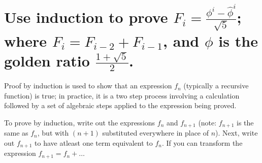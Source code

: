 \section[Problem 2]{Use induction to prove $F_i = \frac{\phi^i - \hat{\phi}^i}{\sqrt{5}}$; where $F_i = F_{i-2} + F_{i-1}$, and $\phi$ is the golden ratio $\frac{1 + \sqrt{5}}{2}$.}

Proof by induction is used to show that an expression $f_n$ (typically a recursive function) is true; in practice, it is a two step process involving a calculation followed by a set of algebraic steps applied to the expression being proved. 

To prove by induction, write out the expressions $f_n$ and $f_{n + 1}$ (note: $f_{n + 1}$ is the same as $f_n$, but with $(n + 1)$ substituted everywhere in place of $n$). Next, write out $f_{n + 1}$ to have atleast one term equivalent to $f_n$. If you can transform the expression $f_{n + 1} = f_n + \dots$

